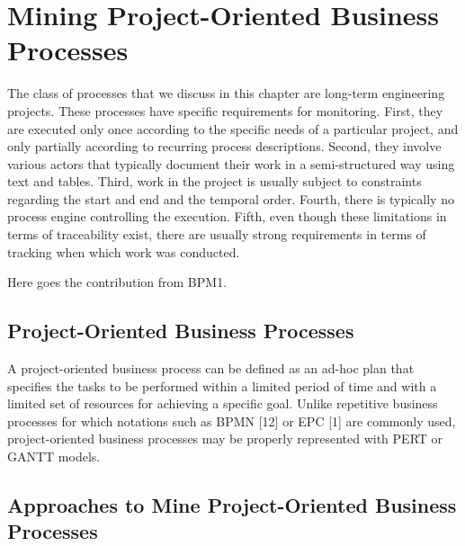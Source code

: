 \chapter{Mining Project-Oriented Business Processes}


The class of processes that we discuss in this chapter are long-term engineering
projects. These processes have specific requirements for monitoring. First, they
are executed only once according to the specific needs of a particular project, and
only partially according to recurring process descriptions. Second, they involve
various actors that typically document their work in a semi-structured way using
text and tables. Third, work in the project is usually subject to constraints
regarding the start and end and the temporal order. Fourth, there is typically
no process engine controlling the execution. Fifth, even though these limitations
in terms of traceability exist, there are usually strong requirements in terms of
tracking when which work was conducted.


Here goes the contribution from BPM1. 

\section{Project-Oriented Business Processes}

A project-oriented business process can be
defined as an ad-hoc plan that specifies the tasks to be performed within a limited
period of time and with a limited set of resources for achieving a specific goal.
Unlike repetitive business processes for which notations such as BPMN [12] or
EPC [1] are commonly used, project-oriented business processes may be properly
represented with PERT or GANTT models.

\section{Approaches to Mine Project-Oriented Business Processes}

